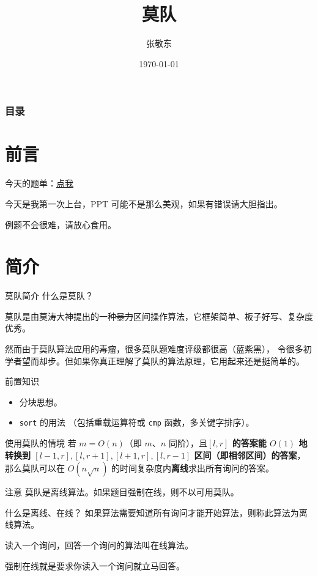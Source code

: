 \documentclass[table]{beamer}
\title{莫队}
\author{张敬东}
\date{\today}
\begin{document}
\frame{\titlepage} %

\begin{frame} %
	\frametitle{目录}
	\tableofcontents
\end{frame}

\section{前言}
\begin{frame}
	今天的题单：{\color{blue}\href{https://www.luogu.com.cn/training/428639}{点我}}

	今天是我第一次上台，PPT 可能不是那么美观，如果有错误请大胆指出。

	例题不会很难，请放心食用。
\end{frame}

\section{简介}

\begin{frame}[fragile]{莫队简介}
	什么是莫队？

	莫队是由莫涛大神提出的一种\sout{暴力}区间操作算法，它框架简单、板子好写、复杂度优秀。

	然而由于莫队算法应用的毒瘤，很多莫队题难度评级都很高（蓝紫黑），
	令很多初学者望而却步。但如果你真正理解了莫队的算法原理，它用起来还是挺简单的。
	\pause

	\begin{block}{前置知识}
		\begin{itemize}
			\item 分块思想。
			\item \verb|sort| 的用法
			（包括重载运算符或 \verb|cmp| 函数，多关键字排序）。
		\end{itemize}
	\end{block}
\end{frame}

\begin{frame}{使用莫队的情境}
	若 $m=O(n)$（即 $m$、$n$ 同阶），且\textbf{$[l,r]$ 的答案能 $O(1)$ 地转换到 
	$[l-1,r],[l,r+1],[l+1,r],[l,r-1]$ 区间（即相邻区间）的答案}，
	那么莫队可以在 $O(n\sqrt{n})$ 的时间复杂度内\textbf{离线}求出所有询问的答案。
	\pause

	\begin{alertblock}{注意}
		莫队是离线算法。如果题目强制在线，则不以可用莫队。
	\end{alertblock}

	\begin{block}{什么是离线、在线？}
		如果算法需要知道所有询问才能开始算法，则称此算法为离线算法。

		读入一个询问，回答一个询问的算法叫在线算法。

		强制在线就是要求你读入一个询问就立马回答。
	\end{block}
\end{frame}
\end{document}
